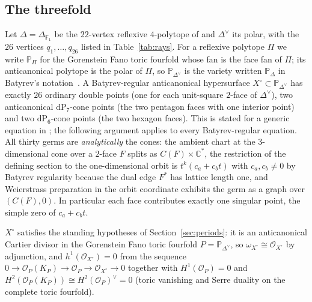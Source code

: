 \documentclass[11pt]{amsart}
\theoremstyle{definition}
\theoremstyle{remark}
\theoremstyle{plain}
\newcommand{\CC}{\mathbb{C}}
\newcommand{\PP}{\mathbb{P}}
\newcommand{\cO}{\mathcal{O}}
\newcommand{\dP}{\mathrm{dP}}
\begin{document}
\subsection{The threefold}\label{sec:X0}
Let $\Delta=\Delta_{\mathbb F_1}$ be the $22$-vertex reflexive
$4$-polytope of \cite[Theorem~6.1]{PaperIII} and
$\Delta^{\vee}$ its polar, with the $26$ vertices
$q_1,\dots,q_{26}$ listed in Table~\ref{tab:rays}.  For a reflexive
polytope $\Pi$ we write $\PP_{\Pi}$ for the Gorenstein Fano toric fourfold
whose fan is the face fan of $\Pi$; its anticanonical polytope is the polar
of $\Pi$, so $\PP_{\Delta^{\vee}}$ is the variety written $\PP_{\Delta}$ in
Batyrev's notation~\cite{Batyrev94}.  A Batyrev-regular
anticanonical hypersurface
$X^{\circ}\subset\PP_{\Delta^{\vee}}$ has exactly $26$ ordinary double
points (one for each unit-square $2$-face of $\Delta^\vee$), two
anticanonical $\dP_7$-cone points (the two pentagon faces with one
interior point) and two $\dP_6$-cone points (the two hexagon faces).
This is stated for a generic equation in \cite[Section~6]{PaperIII}; the
following argument applies to every Batyrev-regular equation.  All thirty
germs are \emph{analytically}
the cones: the ambient chart at the $3$-dimensional cone over a
$2$-face $F$ splits as $C(F)\times\CC^{*}$, the restriction of the
defining section to the one-dimensional orbit is
$t^{k}(c_a+c_bt)$ with $c_a,c_b\neq0$ by Batyrev regularity because
the dual edge $F^{*}$ has lattice length one, and Weierstrass
preparation in the orbit coordinate exhibits the germ as a graph over
$(C(F),0)$.  In particular each face contributes exactly one singular
point, the simple zero of $c_a+c_bt$.

$X^{\circ}$ satisfies the standing hypotheses of
Section~\ref{sec:periods}: it is an anticanonical Cartier divisor in
the Gorenstein Fano toric fourfold $P=\PP_{\Delta^{\vee}}$, so
$\omega_{X^{\circ}}\cong\cO_{X^{\circ}}$ by adjunction, and
$h^1(\cO_{X^{\circ}})=0$ from the sequence
$0\to\cO_P(K_P)\to\cO_P\to\cO_{X^{\circ}}\to0$ together with
$H^1(\cO_P)=0$ and
$H^2(\cO_P(K_P))\cong H^{2}(\cO_P)^{\vee}=0$ (toric vanishing and
Serre duality on the complete toric fourfold).
\end{document}
